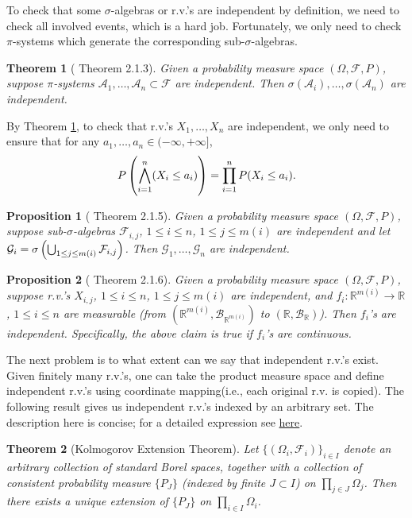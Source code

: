 \documentclass[openany]{book}
\newtheorem{proposition}{Proposition}[chapter]
\newtheorem{theorem}{Theorem}[chapter]
\theoremstyle{definition}
\theoremstyle{remark}
\begin{document}
To check that some $\sigma$-algebras or r.v.'s are independent by definition, we need to check all involved events, which is a hard job. Fortunately, we only need to check $\pi$-systems which generate the corresponding sub-$\sigma$-algebras.
\begin{theorem}[\cite{D10} Theorem 2.1.3]\label{thm:indepPiSystems}
    Given a probability measure space $(\Omega,\mathcal{F},P)$, suppose $\pi$-systems $\mathcal{A}_1,\ldots,\mathcal{A}_n\subset \mathcal{F}$ are independent. Then $\sigma(\mathcal{A}_i),\ldots,\sigma(\mathcal{A}_n)$ are independent.
\end{theorem}
By Theorem \ref{thm:indepPiSystems}, to check that r.v.'s $X_1,\ldots,X_n$ are independent, we only need to ensure that for any $a_1,\ldots,a_n\in(-\infty,+\infty]$,
\begin{equation*}
    P\del{\bigwedge_{i=1}^n(X_i\le a_i)}=\prod_{i=1}^n P(X_i\le a_i).
\end{equation*}
\begin{proposition}[\cite{D10} Theorem 2.1.5]
    Given a probability measure space $(\Omega,\mathcal{F},P)$, suppose sub-$\sigma$-algebras $\mathcal{F}_{i,j}$, $1\le i\le n$, $1\le j\le m(i)$ are independent and let $\mathcal{G}_i=\sigma\del{\bigcup_{1\le j\le m(i)} \mathcal{F}_{i,j}}$. Then $\mathcal{G}_1,\ldots,\mathcal{G}_n$ are independent.
\end{proposition}
\begin{proposition}[\cite{D10} Theorem 2.1.6]
    Given a probability measure space $(\Omega,\mathcal{F},P)$, suppose r.v.'s $X_{i,j}$, $1\le i\le n$, $1\le j\le m(i)$ are independent, and $f_i:\mathbb{R}^{m(i)}\to \mathbb{R}$, $1\le i\le n$ are measurable (from $(\mathbb{R}^{m(i)},\mathcal{B}_{\mathbb{R}^{m(i)}})$ to $(\mathbb{R},\mathcal{B}_{\mathbb{R}})$). Then $f_i$'s are independent. Specifically, the above claim is true if $f_i$'s are continuous.
\end{proposition}

The next problem is to what extent can we say that independent r.v.'s exist. Given finitely many r.v.'s, one can take the product measure space and define independent r.v.'s using coordinate mapping(i.e., each original r.v. is copied). The following result gives us independent r.v.'s indexed by an arbitrary set. The description here is concise; for a detailed expression see \href{http://www.math.nus.edu.sg/~matsr/ProbI/Lecture2.pdf}{here}.
\begin{theorem}[Kolmogorov Extension Theorem]
    Let $\{(\Omega_i,\mathcal{F}_i)\}_{i\in I}$ denote an arbitrary collection of standard Borel spaces, together with a collection of consistent probability measure $\{P_J\}$ (indexed by finite $J\subset I$) on $\prod_{j\in J}\Omega_j$. Then there exists a unique extension of $\{P_J\}$ on $\prod_{i\in I}\Omega_i$.
\end{theorem}
\end{document}
